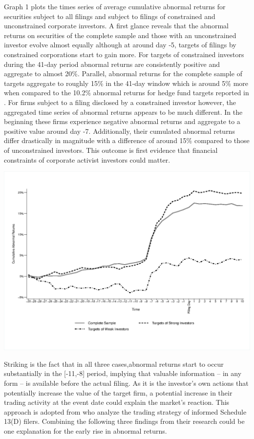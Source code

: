 \documentclass[12pt]{article}
\begin{document}
Graph 1 plots the times series of average cumulative abnormal returns for securities subject to all filings and subject to filings of constrained and unconstrained corporate investors. A first glance reveals that the abnormal returns on securities of the complete sample and those with an unconstrained investor evolve almost equally although at around day -5, targets of filings by constrained corporations start to gain more. For targets of constrained investors during the 41-day period abnormal returns are consistently positive and aggregate to almost 20\%. Parallel, abnormal returns for the complete sample of targets aggregate to roughly 15\% in the 41-day window which is around 5\% more when compared to the 10.2\% abnormal returns for hedge fund targets reported in \citet[p.208]{Klein2009}.
For firms subject to a filing disclosed by a constrained investor however, the aggregated time series of abnormal returns  appears to be much different. In the beginning these firms experience negative abnormal returns and aggregate to a positive value around day -7. Additionally, their cumulated abnormal returns differ drastically in magnitude with a difference of around 15\% compared to those of unconstrained investors. This outcome is first evidence that financial constraints of corporate activist investors could matter.
\begin{table}
	\centering
	\begin{adjustbox}{max width=\textwidth}
		\includegraphics{Abnormal_Returns_Strong_weak.eps} \label{AR}
	\end{adjustbox}
\end{table}
Striking is the fact that in all three cases,abnormal returns start to occur substantially in the [-11,-8] period, implying that valuable information -- in any form -- is available before the actual filing. As it is the investor's own actions that potentially increase the value of the target firm, a potential increase in their trading activity at the event date could explain the market's reaction. This approach is adopted from  \citet[p.1561]{Collin-Dufresne2015} who analyze the trading strategy of informed Schedule 13(D) filers. Combining the following three findings from their research could be one explanation for the early rise in abnormal returns.\\
\end{document}
